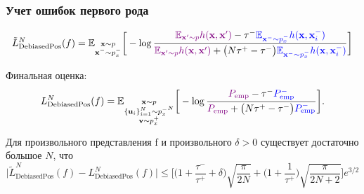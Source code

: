 \documentclass[
	11pt, %
	t, %
        russian
]{beamer}
\begin{document}
\begin{frame}
    \frametitle{Учет ошибок первого рода}
\scriptsize

\begin{equation*}
\tilde{L}_{\text{DebiasedPos}}^N (f) = \mathbb{E}_{\substack{\textbf{x} \sim p \\ \textbf{x}^- \sim p_x^-}} \bigg[ - \log \frac{\color{violet} \mathbb{E}_{\textbf{x}' \sim p} h(\textbf{x}, \textbf{x}') \color{black} - \tau^- \color{blue} \mathbb{E}_{\textbf{x}^- \sim p_x^-} h(\textbf{x}, \textbf{x}_i^-)}{\color{violet} \mathbb{E}_{\textbf{x}' \sim p} h(\textbf{x}, \textbf{x}') \color{black} + \big(N \tau^+ - \tau^-\big) \color{blue} \mathbb{E}_{\textbf{x}^- \sim p_x^-} h(\textbf{x}, \textbf{x}_i^-)}\bigg]
\end{equation*}

Финальная оценка:
\begin{equation*}
L_{\text{DebiasedPos}}^N (f) = \mathbb{E}_{\substack{\textbf{x} \sim p \\ \{\textbf{u}_i\}_{i=1}^N \sim {p_x^-}^N \\ \textbf{v} \sim p_x^+}} \bigg[-\log \frac{\color{violet}P_{\text{emp}} \color{black} - \tau^- \color{blue} P_{\text{emp}}^-} {\color{violet}P_{\text{emp}} \color{black} + \big(N \tau^+ - \tau^-\big) \color{blue} P_{\text{emp}}^- }\bigg].
\end{equation*}

\begin{theorem}
Для произвольного представления f и произвольного $\delta > 0$ существует достаточно большое $N$, что
\begin{equation*}
\big|\tilde{L}_{\text{DebiasedPos}}^N (f) - L_{\text{DebiasedPos}}^N (f)\big| \leq \bigg[\bigg(1 + \frac{\tau^-}{\tau^+} + \delta\bigg) \sqrt{\frac{\pi}{2N}} + \bigg(1 + \frac{1}{\tau^+}\bigg) \sqrt{\frac{\pi}{2N + 2}}\bigg] e^{3/2}
\end{equation*}
\end{theorem}

\end{frame}
\end{document}
